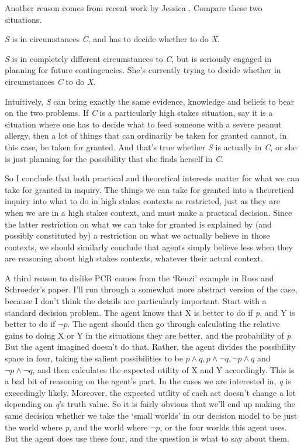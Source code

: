 Another reason comes from recent work by Jessica \cite{Brown2013}. Compare these two situations.

\begin{enumerate*}
\item \emph{S} is in circumstances \emph{C}, and has to decide whether to do \emph{X}.

\item \emph{S} is in completely different circumstances to \emph{C}, but is seriously engaged in planning for future contingencies. She's currently trying to decide whether in circumstances \emph{C} to do \emph{X}.

\end{enumerate*}
Intuitively, \emph{S} can bring exactly the same evidence, knowledge and beliefs to bear on the two problems. If \emph{C} is a particularly high stakes situation, say it is a situation where one has to decide what to feed someone with a severe peanut allergy, then a lot of things that can ordinarily be taken for granted cannot, in this case, be taken for granted. And that's true whether \emph{S} is actually in \emph{C}, or she is just planning for the possibility that she finds herself in \emph{C}.

So I conclude that both practical and theoretical interests matter for what we can take for granted in inquiry. The things we can take for granted into a theoretical inquiry into what to do in high stakes contexts as restricted, just as they are when we are in a high stakes context, and must make a practical decision. Since the latter restriction on what we can take for granted is explained by (and possibly constituted by) a restriction on what we actually believe in those contexts, we should similarly conclude that agents simply believe less when they are reasoning about high stakes contexts, whatever their actual context.

A third reason to dislike PCR comes from the `Renzi' example in Ross and Schroeder's paper. I'll run through a somewhat more abstract version of the case, because I don't think the details are particularly important. Start with a standard decision problem. The agent knows that X is better to do if \emph{p}, and Y is better to do if $\neg p$. The agent should then go through calculating the relative gains to doing X or Y in the situations they are better, and the probability of \emph{p}. But the agent imagined doesn't do that. Rather, the agent divides the possibility space in four, taking the salient possibilities to be $p \wedge q, p \wedge \neg q, \neg p \wedge q$ and $\neg p \wedge \neg q$, and then calculates the expected utility of X and Y accordingly. This is a bad bit of reasoning on the agent's part. In the cases we are interested in, \emph{q} is exceedingly likely. Moreover, the expected utility of each act doesn't change a lot depending on \emph{q}'s truth value. So it is fairly obvious that we'll end up making the same decision whether we take the `small worlds' in our decision model to be just the world where \emph{p}, and the world where $\neg p$, or the four worlds this agent uses. But the agent does use these four, and the question is what to say about them.

